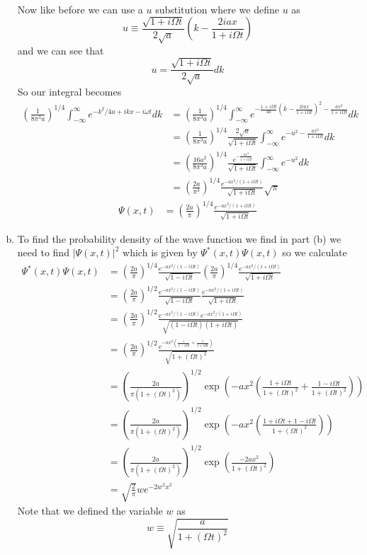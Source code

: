 \documentclass[11pt]{article}
\numberwithin{equation}{section}
\begin{document}
\begin{enumerate}[(a)]
\begin{align*}
\end{align*}
Now like before we can use a $u$ substitution where we define $u$ as
$$u\equiv\frac{\sqrt{1 + i\Omega t}}{2\sqrt{a}}\left(k-\frac{2iax}{1+i\Omega t}\right)$$
and we can see that
$$u = \frac{\sqrt{1 + i\Omega t}}{2\sqrt{a}}dk$$
So our integral becomes 
\begin{align*}
\left(\frac{1}{8\pi^3a}\right)^{1/4}\int_{-\infty}^{\infty} e^{-{k^2}/{4a}+ikx-i\omega t}dk &= \left(\frac{1}{8\pi^3a}\right)^{1/4}\int_{-\infty}^{\infty} e^{-\frac{1 + i\Omega t}{4a}\left(k-\frac{2iax}{1+i\Omega t}\right)^2 - \frac{ax^2}{1+i\Omega t}}dk\\
&= \left(\frac{1}{8\pi^3a}\right)^{1/4}\frac{2\sqrt{a}}{\sqrt{1 + i\Omega t}}\int_{-\infty}^{\infty} e^{-u^2 - \frac{ax^2}{1+i\Omega t}}dk\\
&= \left(\frac{16a^2}{8\pi^3a}\right)^{1/4}\frac{e^{-\frac{ax^2}{1+i\Omega t}}}{\sqrt{1 + i\Omega t}}\int_{-\infty}^{\infty} e^{-u^2}dk\\
&= \left(\frac{2a}{\pi^3}\right)^{1/4}\frac{e^{-ax^2/(1+i\Omega t)}}{\sqrt{1 + i\Omega t}}\sqrt{\pi}
\end{align*}
\begin{align*}
\Psi(x,t) &= \left(\frac{2a}{\pi}\right)^{1/4}\frac{e^{-ax^2/(1+i\Omega t)}}{\sqrt{1 + i\Omega t}}
\end{align*}

\item
To find the probability density of the wave function we find in part (b) we need to find $|\Psi(x,t)|^2$ which is given by $\Psi^*(x,t)\Psi(x,t)$ so we calculate
\begin{align*}
\Psi^*(x,t)\Psi(x,t) &= \left(\frac{2a}{\pi}\right)^{1/4}\frac{e^{-ax^2/(1-i\Omega t)}}{\sqrt{1 - i\Omega t}}\left(\frac{2a}{\pi}\right)^{1/4}\frac{e^{-ax^2/(1+i\Omega t)}}{\sqrt{1 + i\Omega t}}\\
&= \left(\frac{2a}{\pi}\right)^{1/2}\frac{e^{-ax^2/(1-i\Omega t)}}{\sqrt{1 - i\Omega t}}\frac{e^{-ax^2/(1+i\Omega t)}}{\sqrt{1 + i\Omega t}}\\
&= \left(\frac{2a}{\pi}\right)^{1/2}\frac{e^{-ax^2/(1-i\Omega t)}e^{-ax^2/(1+i\Omega t)}}{\sqrt{(1-i\Omega t)(1 + i\Omega t)}}\\
&= \left(\frac{2a}{\pi}\right)^{1/2}\frac{e^{-ax^2\left(\frac{1}{1-i\Omega t}+\frac{1}{1+i\Omega t}\right)}}{\sqrt{1 + (\Omega t)^2}}\\
&= \left(\frac{2a}{\pi(1+(\Omega t)^2)}\right)^{1/2}\exp\left(-ax^2\left(\frac{1+i\Omega t}{1+(\Omega t)^2}+\frac{1-i\Omega t}{1+(\Omega t)^2}\right)\right)\\
&= \left(\frac{2a}{\pi(1+(\Omega t)^2)}\right)^{1/2}\exp\left(-ax^2\left(\frac{1+i\Omega t+1-i\Omega t}{1+(\Omega t)^2}\right)\right)\\
&= \left(\frac{2a}{\pi(1+(\Omega t)^2)}\right)^{1/2}\exp\left(\frac{-2ax^2}{1+(\Omega t)^2}\right)\\
&= \sqrt{\frac{2}{\pi}}we^{-2w^2x^2}
\end{align*}
Note that we defined the variable $w$ as
$$w\equiv\sqrt{\frac{a}{1+(\Omega t)^2}}$$


\end{enumerate}
\end{document}
